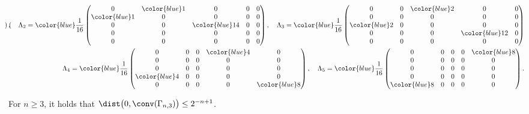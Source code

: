 \begin{exa}
\begin{align*}
\begin{pmatrix}
            \end{pmatrix},\quad
        \Lambda_2 = {\color{blue}\frac{1}{16}} \begin{pmatrix}
            0 & {\color{blue}1} & 0 & 0 & 0 \\ {\color{blue}1} & 0 & 0 & 0 & 0 \\ 0 & 0 & {\color{blue}14} & 0 & 0 \\ 0 & 0 & 0 & 0 & 0 \\ 0 & 0 & 0 & 0 & 0
            \end{pmatrix},\quad
        \Lambda_3 = {\color{blue}\frac{1}{16}} \begin{pmatrix}
            0 & 0 & {\color{blue}2} & 0 & 0 \\ 0 & 0 & 0 & 0 & 0 \\ {\color{blue}2} & 0 & 0 & 0 & 0 \\ 0 & 0 & 0 & {\color{blue}12} & 0 \\ 0 & 0 & 0 & 0 & 0
            \end{pmatrix}\\
        \Lambda_4 = {\color{blue}\frac{1}{16}} \begin{pmatrix}
            0 & 0 & 0 & {\color{blue}4} & 0 \\ 0 & 0 & 0 & 0 & 0 \\ 0 & 0 & 0 & 0 & 0 \\ {\color{blue}4} & 0 & 0 & 0 & 0 \\ 0 & 0 & 0 & 0 & {\color{blue}8}
            \end{pmatrix},\quad
        \Lambda_5 = {\color{blue}\frac{1}{16}} \begin{pmatrix}
            0 & 0 & 0 & 0 & {\color{blue}8} \\ 0 & 0 & 0 & 0 & 0 \\ 0 & 0 & 0 & 0 & 0 \\ 0 & 0 & 0 & 0 & 0 \\ {\color{blue}8} & 0 & 0 & 0 & 0
            \end{pmatrix}.
    \end{align*}
\end{exa}


\begin{lem}\label{lem:distKravtsov}
For $n \geq 3$, it holds that $\dist\big( 0, \conv(\Gamma_{n,3}) \big) \leq 2^{-n+1}$.
\end{lem}

